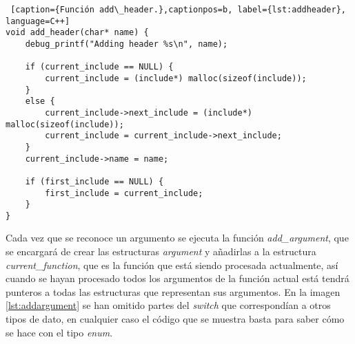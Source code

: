 \bigskip

\begin{minipage}{\linewidth}
\begin{lstlisting} [caption={Función add\_header.},captionpos=b, label={lst:addheader}, language=C++]
void add_header(char* name) {
	debug_printf("Adding header %s\n", name);

	if (current_include == NULL) {
		current_include = (include*) malloc(sizeof(include));
	}
	else {
		current_include->next_include = (include*) malloc(sizeof(include));
		current_include = current_include->next_include;
	}
	current_include->name = name;

	if (first_include == NULL) {
		first_include = current_include;
	}
}
\end{lstlisting}
\end{minipage}

\bigskip

Cada vez que se reconoce un argumento se ejecuta la función \textit{add\_argument}, que se encargará de crear las estructuras \textit{argument} y añadirlas a la estructura \textit{current\_function}, que es la función que está siendo procesada actualmente, así cuando se hayan procesado todos los argumentos de la función actual está tendrá punteros a todas las estructuras que representan sus argumentos. En la imagen \ref{lst:addargument} se han omitido partes del \textit{switch} que correspondían a otros tipos de dato, en cualquier caso el código que se muestra basta para saber cómo se hace con el tipo \textit{enum}. 
 
\bigskip

